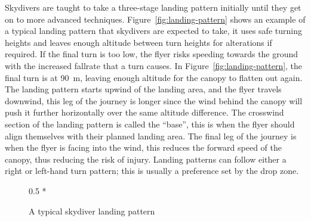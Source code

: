 Skydivers are taught to take a three-stage landing pattern initially until they get on to more advanced techniques. Figure~\vref{fig:landing-pattern} shows an example of a typical landing pattern that skydivers are expected to take, it uses safe turning heights and leaves enough altitude between turn heights for alterations if required. If the final turn is too low, the flyer risks speeding towards the ground with the increased fallrate that a turn causes. In Figure~\vref{fig:landing-pattern}, the final turn is at \SI{90}{\metre}, leaving enough altitude for the canopy to flatten out again. The landing pattern starts upwind of the landing area, and the flyer travels downwind, this leg of the journey is longer since the wind behind the canopy will push it further horizontally over the same altitude difference. The crosswind section of the landing pattern is called the ``base'', this is when the flyer should align themselves with their planned landing area. The final leg of the journey is when the flyer is facing into the wind, this reduces the forward speed of the canopy, thus reducing the risk of injury. Landing patterns can follow either a right or left-hand turn pattern; this is usually a preference set by the drop zone.

\begin{figure}[ht]
  \centering
  \begin{scaletikzpicturetowidth}{0.5 * \linewidth}
  \end{scaletikzpicturetowidth}
  \caption{A typical skydiver landing pattern}\label{fig:landing-pattern}
\end{figure}
